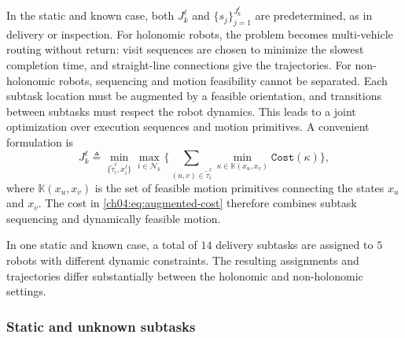 In the static and known case, both $J_k^\ell$ and
$\{s_j\}_{j=1}^{J_k^\ell}$ are predetermined, as in delivery or inspection.
For holonomic robots, the problem becomes multi-vehicle routing without return:
visit sequences are chosen to minimize the slowest completion time, and
straight-line connections give the trajectories. For non-holonomic robots,
sequencing and motion feasibility cannot be separated.
Each subtask location must be augmented by a feasible orientation, and
transitions between subtasks must respect the robot dynamics. This leads to a
joint optimization over execution sequences and motion primitives. A convenient
formulation is
\begin{equation}
\label{ch04:eq:augmented-cost}
J_k^\ell \triangleq
\min_{\{\widetilde{\tau}_i^\ell,x_i^\ell\}}
\max_{i\in\mathcal{N}_k}
\Biggl\{
\sum_{(u,v)\in \widetilde{\tau}_i^\ell}
\min_{\kappa\in\mathbb{K}(x_u,x_v)}
\texttt{Cost}(\kappa)
\Biggr\},
\end{equation}
where $\mathbb{K}(x_u,x_v)$ is the set of feasible motion primitives
connecting the states $x_u$ and $x_v$. The cost in
\eqref{ch04:eq:augmented-cost} therefore combines subtask sequencing and
dynamically feasible motion. 

\begin{example}
\label{ch04:example:StaticKnown}
In one static and known
case, a total of $14$ delivery subtasks are assigned to $5$ robots with
different dynamic constraints. The resulting assignments and trajectories differ
substantially between the holonomic and non-holonomic settings.
\end{example}

\subsubsection{Static and unknown subtasks}
\label{ch04:sec:staticunknown}

